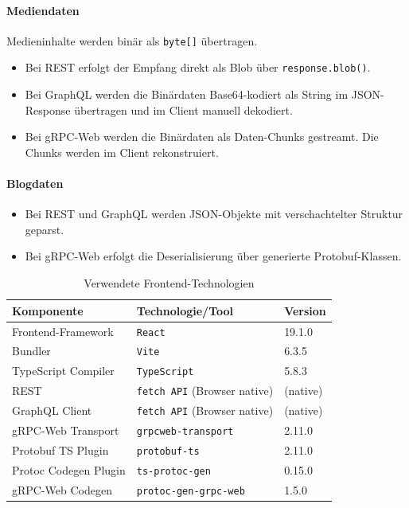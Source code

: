 \begin{enumerate}
\paragraph{Mediendaten}
Medieninhalte werden binär als \texttt{byte[]} übertragen.
\begin{itemize}
	\item Bei REST erfolgt der Empfang direkt als Blob über \texttt{response.blob()}.
	\item Bei GraphQL werden die Binärdaten Base64-kodiert als String im JSON-Response übertragen und im Client manuell dekodiert.
	\item Bei gRPC-Web werden die Binärdaten als Daten-Chunks gestreamt. Die Chunks werden im Client rekonstruiert.
\end{itemize}

\paragraph{Blogdaten}
\begin{itemize}
	\item Bei REST und GraphQL werden JSON-Objekte mit verschachtelter Struktur geparst.
	\item Bei gRPC-Web erfolgt die Deserialisierung über generierte Protobuf-Klassen.
\end{itemize}

\begin{table}[h]
	\centering
	\caption{Verwendete Frontend-Technologien}
	\begin{tabular}{lll}
		\hline
		\textbf{Komponente} & \textbf{Technologie/Tool} & \textbf{Version} \\
		\hline
		Frontend-Framework & \texttt{React} & 19.1.0 \\
		Bundler & \texttt{Vite} & 6.3.5 \\
		TypeScript Compiler & \texttt{TypeScript} & 5.8.3 \\
		REST & \texttt{fetch API} (Browser native) & (native) \\
		GraphQL Client & \texttt{fetch API} (Browser native) & (native) \\
		gRPC-Web Transport & \texttt{grpcweb-transport} & 2.11.0 \\
		Protobuf TS Plugin & \texttt{protobuf-ts} & 2.11.0 \\
		Protoc Codegen Plugin & \texttt{ts-protoc-gen} & 0.15.0 \\
		gRPC-Web Codegen & \texttt{protoc-gen-grpc-web} & 1.5.0 \\
		\hline
	\end{tabular}
\end{table}


\end{enumerate}
